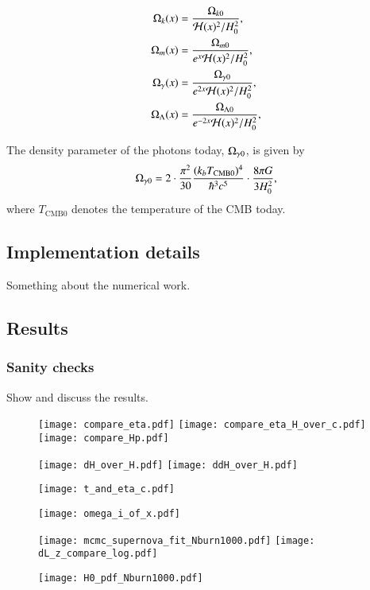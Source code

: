 %
\begin{align}
    \Omega_{k}(x) &= \frac{\Omega_{k0}}{\mathcal{H}(x)^2 / H_0^2}, \\ 
    \Omega_{m}(x) &= \frac{\Omega_{m0}}{e^x \mathcal{H}(x)^2 / H_0^2}, \\ 
    \Omega_{\gamma}(x) &= \frac{\Omega_{\gamma 0}}{e^{2x} \mathcal{H}(x)^2 / H_0^2}, \\ 
    \Omega_{\Lambda}(x) &= \frac{\Omega_{\Lambda 0}}{e^{-2x} \mathcal{H}(x)^2 / H_0^2},     
\end{align}
%




The density parameter of the photons today, $\Omega_{\gamma 0}$, is given by 
\begin{equation}
    \Omega_{\gamma 0} = 2 \cdot \frac{\pi^2}{30} \frac{(k_b T_\mathrm{CMB0})^4}{\hbar^3 c^5} \cdot \frac{8\pi G}{3H_0^2}, \label{eq:M1:theory:omega_gamma0_Told}
\end{equation}
where $T_\mathrm{CMB0}$ denotes the temperature of the CMB today. 


\subsection{Implementation details}\label{M1:implementation} 
Something about the numerical work.

\subsection{Results}\label{M1:results}
\subsubsection{Sanity checks}
Show and discuss the results.



\begin{figure}
    \texttt{[image: compare\_eta.pdf]}
    \texttt{[image: compare\_eta\_H\_over\_c.pdf]}
    \texttt{[image: compare\_Hp.pdf]}
\end{figure}

\begin{figure}[ht!]
    \texttt{[image: dH\_over\_H.pdf]}
    \texttt{[image: ddH\_over\_H.pdf]}
\end{figure}

\begin{figure}[ht!]
    \texttt{[image: t\_and\_eta\_c.pdf]}
\end{figure}


\begin{figure}[ht!]
    \texttt{[image: omega\_i\_of\_x.pdf]}
\end{figure}

\begin{figure}[ht!]
    \texttt{[image: mcmc\_supernova\_fit\_Nburn1000.pdf]}
    \texttt{[image: dL\_z\_compare\_log.pdf]}
\end{figure}

\begin{figure}[ht!]
    \texttt{[image: H0\_pdf\_Nburn1000.pdf]}    
\end{figure}